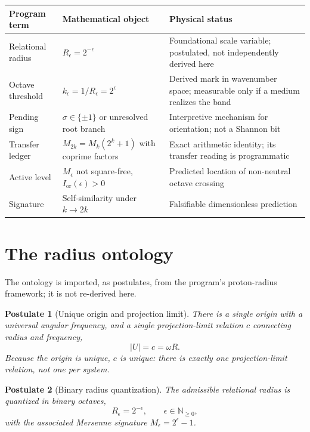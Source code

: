 \documentclass[11pt,a4paper]{article}
\newtheorem{postulate}{Postulate}
\newcommand{\Ior}{I_{\mathrm{or}}}
\begin{document}
\begin{center}
\renewcommand{\arraystretch}{1.18}
\begin{tabular}{>{\raggedright\arraybackslash}p{3.4cm} >{\raggedright\arraybackslash}p{4.4cm} >{\raggedright\arraybackslash}p{6.0cm}}
\toprule
Program term & Mathematical object & Physical status\\
\midrule
Relational radius & $R_\epsilon=2^{-\epsilon}$ & Foundational scale variable; postulated, not independently derived here\\
Octave threshold & $k_\epsilon=1/R_\epsilon=2^\epsilon$ & Derived mark in wavenumber space; measurable only if a medium realizes the band\\
Pending sign & $\sigma\in\{\pm1\}$ or unresolved root branch & Interpretive mechanism for orientation; not a Shannon bit\\
Transfer ledger & $M_{2k}=M_k(2^k+1)$ with coprime factors & Exact arithmetic identity; its transfer reading is programmatic\\
Active level & $M_\epsilon$ not square-free, $\Ior(\epsilon)>0$ & Predicted location of non-neutral octave crossing\\
Signature & Self-similarity under $k\to2k$ & Falsifiable dimensionless prediction\\
\bottomrule
\end{tabular}
\end{center}

\section{The radius ontology}\label{sec:radius}

The ontology is imported, as postulates, from the program's proton-radius framework; it is not re-derived here.

\begin{postulate}[Unique origin and projection limit]\label{post:origin}
There is a single origin with a universal angular frequency, and a single projection-limit relation $c$ connecting radius and frequency,
\[
|U|=c=\omega R .
\]
Because the origin is unique, $c$ is unique: there is exactly one projection-limit relation, not one per system.
\end{postulate}

\begin{postulate}[Binary radius quantization]\label{post:binary}
The admissible relational radius is quantized in binary octaves,
\[
R_\epsilon = 2^{-\epsilon},\qquad \epsilon\in\mathbb{N}_{\ge 0},
\]
with the associated Mersenne signature $M_\epsilon=2^{\epsilon}-1$.
\end{postulate}
\end{document}
